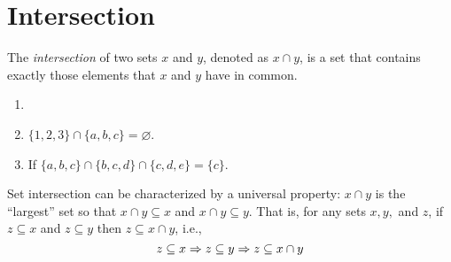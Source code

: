 \documentclass[article,10pt,oneside]{memoir}
\begin{document}
\section{Intersection}
\label{sec:intersection}

\begin{defn}
  The \emph{intersection} of two sets $x$ and $y$, denoted as $x \cap y$, is a set that contains exactly those elements that $x$ and $y$ have in common.
\end{defn}

\begin{eg}
  \begin{enumerate}
  \item[]
  \item $\{1,2,3\} \cap \{a,b,c\} = \varnothing$.
  \item If $\{a,b,c\} \cap \{b,c,d\} \cap \{c,d,e\} = \{c\}$.
  \end{enumerate}
\end{eg}

\begin{rmk}
  Set intersection can be characterized by a universal property: $x \cap y$ is the ``largest'' set so that $x \cap y \subseteq x$ and $x \cap y \subseteq y$.
  That is, for any sets $x, y,$ and $z$, if $z \subseteq x$ and $z \subseteq y$ then $z \subseteq x \cap y$, i.e.,
  \[
    z \subseteq x \Rightarrow z \subseteq y \Rightarrow z \subseteq x \cap y
  \]
\end{rmk}
\end{document}

